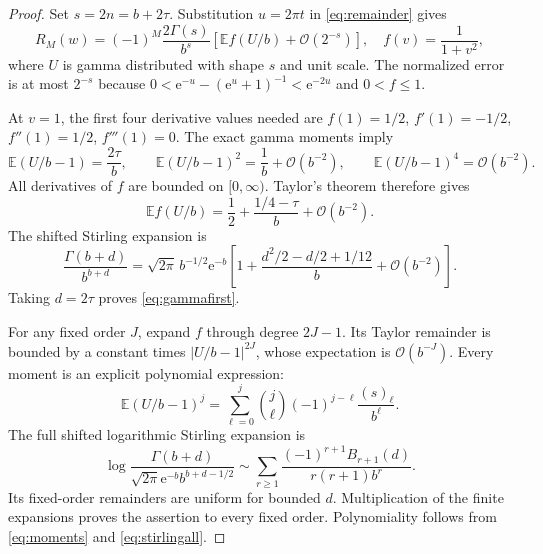 \documentclass[11pt,a4paper]{article}
\theoremstyle{definition}
\numberwithin{equation}{section}
\newcommand{\e}{\mathrm e}
\newcommand{\Oh}{\mathcal O}
\newcommand{\rising}[2]{(#1)_{#2}}
\begin{document}
\begin{proof}
Set $s=2n=b+2\tau$. Substitution $u=2\pi t$ in \eqref{eq:remainder} gives
\begin{equation}
 R_M(w)=(-1)^M\frac{2\Gamma(s)}{b^s}
 \left[\mathbb E f(U/b)+\Oh(2^{-s})\right],
 \quad f(v)=\frac1{1+v^2},
 \label{eq:expectation}
\end{equation}
where $U$ is gamma distributed with shape $s$ and unit scale. The normalized error is at most $2^{-s}$ because
$0<\e^{-u}-(\e^u+1)^{-1}<\e^{-2u}$ and $0<f\le1$.

At $v=1$, the first four derivative values needed are
$f(1)=1/2$, $f'(1)=-1/2$, $f''(1)=1/2$, $f'''(1)=0$.
The exact gamma moments imply
\[
 \mathbb E(U/b-1)=\frac{2\tau}{b},\qquad
 \mathbb E(U/b-1)^2=\frac1b+\Oh(b^{-2}),\qquad
 \mathbb E(U/b-1)^4=\Oh(b^{-2}).
\]
All derivatives of $f$ are bounded on $[0,\infty)$. Taylor's theorem therefore gives
\[
 \mathbb E f(U/b)=\frac12+\frac{1/4-\tau}{b}+\Oh(b^{-2}).
\]
The shifted Stirling expansion \cite{dlmf} is
\begin{equation}
 \frac{\Gamma(b+d)}{b^{b+d}}=
 \sqrt{2\pi}\,b^{-1/2}\e^{-b}
 \left[1+\frac{d^2/2-d/2+1/12}{b}+\Oh(b^{-2})\right].
 \label{eq:stirling1}
\end{equation}
Taking $d=2\tau$ proves \eqref{eq:gammafirst}.

For any fixed order $J$, expand $f$ through degree $2J-1$. Its Taylor remainder is bounded by a constant times $|U/b-1|^{2J}$, whose expectation is $\Oh(b^{-J})$. Every moment is an explicit polynomial expression:
\begin{equation}
 \mathbb E(U/b-1)^j=
 \sum_{\ell=0}^j\binom j\ell(-1)^{j-\ell}
             \frac{\rising{s}{\ell}}{b^\ell}.
 \label{eq:moments}
\end{equation}
The full shifted logarithmic Stirling expansion is
\begin{equation}
 \log\frac{\Gamma(b+d)}{\sqrt{2\pi}\e^{-b}b^{b+d-1/2}}
 \sim\sum_{r\ge1}\frac{(-1)^{r+1}B_{r+1}(d)}{r(r+1)b^r}.
 \label{eq:stirlingall}
\end{equation}
Its fixed-order remainders are uniform for bounded $d$. Multiplication of the finite expansions proves the assertion to every fixed order. Polynomiality follows from \eqref{eq:moments} and \eqref{eq:stirlingall}.
\end{proof}
\end{document}
